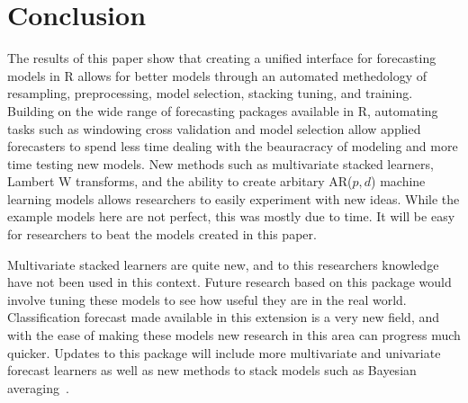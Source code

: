\documentclass[12pt]{article}\usepackage[]{graphicx}\usepackage[]{color}
\theoremstyle{definition}
\let\proglang=\textsf
\begin{document}
\section{Conclusion}

The results of this paper show that creating a unified interface for forecasting models in \proglang{R} allows for better models through an automated methedology of resampling, preprocessing, model selection, stacking tuning, and training. Building on the wide range of forecasting packages available in \proglang{R}, automating tasks such as windowing cross validation and model selection allow applied forecasters to spend less time dealing with the beauracracy of modeling and more time testing new models. New methods such as multivariate stacked learners, Lambert W transforms, and the ability to create arbitary AR($p,d$) machine learning models allows researchers to easily experiment with new ideas. While the example models here are not perfect, this was mostly due to time. It will be easy for researchers to beat the models created in this paper.

Multivariate stacked learners are quite new, and to this researchers knowledge have not been used in this context. Future research based on this package would involve tuning these models to see how useful they are in the real world. Classification forecast made available in this extension is a very new field, and with the ease of making these models new research in this area can progress much quicker. Updates to this package will include more multivariate and univariate forecast learners as well as new methods to stack models such as Bayesian averaging~\cite{bayesianAverage}.

{}

\end{document}
